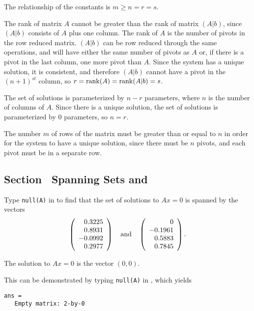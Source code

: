 \documentclass{ximera}
\begin{document}
\ans The relationship of the constants is $m \geq n = r = s$.

\soln The rank of matrix $A$ cannot be greater than the rank of matrix
$(A|b)$, since $(A|b)$ consists of $A$ plus one column.  The rank of $A$
is the number of pivots in the row reduced matrix.  $(A|b)$ can be row 
reduced through the same operations, and will have either the same number
of pivots as $A$ or, if there is a pivot in the last column, one more
pivot than $A$.  Since the system has a unique solution, it is consistent,
and therefore $(A|b)$ cannot have a pivot in the $(n + 1)^{st}$ column, so
$r = {\rm rank}(A) = {\rm rank}(A|b) = s$.

\para The set of solutions is parameterized by $n - r$ parameters,
where $n$ is the number of columns of $A$.  Since there is a unique
solution, the set of solutions is parameterized by $0$ parameters,
so $n = r$.

\para The number $m$ of rows of the matrix must be greater than or
equal to $n$ in order for the system to have a unique solution, since
there must be $n$ pivots, and each pivot must be in a separate row.


\subsection*{Section~\protect{\ref{S:5.3}} Spanning Sets and \Matlab}

Type {\tt null(A)} in \Matlab to find that the set of solutions to
$Ax = 0$ is spanned by the vectors
\[
\left(\begin{array}{r} 0.3225 \\ 0.8931 \\ -0.0992 \\ 0.2977
\end{array}\right) \quad\mbox{and}\quad \left(\begin{array}{r} 0 \\ -0.1961 \\
0.5883 \\ 0.7845 \end{array}\right).
\]

 \ans The solution to $Ax = 0$ is the vector $(0,0).$

\soln This can be demonstrated by typing {\tt null(A)} in \Matlab, which
yields
\begin{verbatim}
ans =
   Empty matrix: 2-by-0
\end{verbatim}
\end{document}
